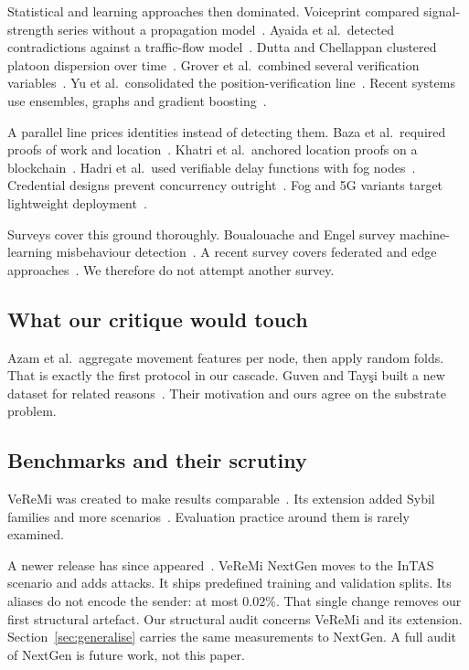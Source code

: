 \documentclass[journal,twoside]{IEEEtran}
\begin{document}
Statistical and learning approaches then dominated.
Voiceprint compared signal-strength series without a propagation model~\cite{yao2017}.
Ayaida et al.\ detected contradictions against a traffic-flow model~\cite{ayaida2019}.
Dutta and Chellappan clustered platoon dispersion over time~\cite{dutta2013}.
Grover et al.\ combined several verification variables~\cite{grover2015}.
Yu et al.\ consolidated the position-verification line~\cite{yu2013}.
Recent systems use ensembles, graphs and gradient boosting~\cite{azam2022,sefati2025}.

A parallel line prices identities instead of detecting them.
Baza et al.\ required proofs of work and location~\cite{baza2020}.
Khatri et al.\ anchored location proofs on a blockchain~\cite{khatri2024}.
Hadri et al.\ used verifiable delay functions with fog nodes~\cite{hadri2026}.
Credential designs prevent concurrency outright~\cite{funderburg2021,akil2023}.
Fog and 5G variants target lightweight deployment~\cite{almazroi2024}.

Surveys cover this ground thoroughly.
Boualouache and Engel survey machine-learning misbehaviour detection~\cite{boualouache2023}.
A recent survey covers federated and edge approaches~\cite{tits2025survey}.
We therefore do not attempt another survey.

\subsection{What our critique would touch}



Azam et al.\ aggregate movement features per node, then apply random folds.
That is exactly the first protocol in our cascade.
Guven and Tay\c{s}i built a new dataset for related reasons~\cite{guven2024}.
Their motivation and ours agree on the substrate problem.

\subsection{Benchmarks and their scrutiny}

VeReMi was created to make results comparable~\cite{heijden2018}.
Its extension added Sybil families and more scenarios~\cite{kamel2020}.
Evaluation practice around them is rarely examined.

A newer release has since appeared~\cite{nextgen2026}.
VeReMi NextGen moves to the InTAS scenario and adds attacks.
It ships predefined training and validation splits.
Its aliases do not encode the sender: at most 0.02\%.
That single change removes our first structural artefact.
Our structural audit concerns VeReMi and its extension.
Section~\ref{sec:generalise} carries the same measurements to NextGen.
A full audit of NextGen is future work, not this paper.
\end{document}
